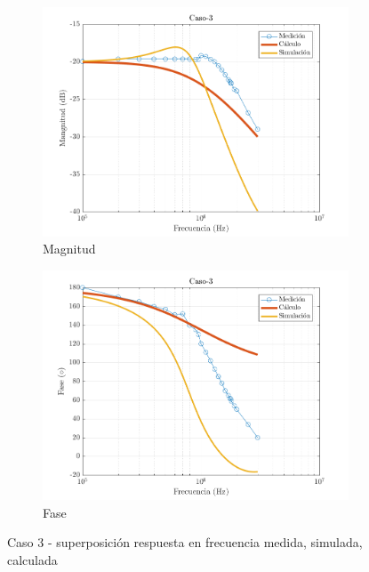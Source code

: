 \documentclass[../../main.tex]{subfiles}
\begin{document}
\begin{figure}[H]
\centering
\begin{subfigure}[http]{0.49\textwidth}
\includegraphics[width=\textwidth]{imagenes/Caso-3_mag_inv.png}
\caption{Magnitud}\label{fig=magInvC3}
\end{subfigure}
\begin{subfigure}[http]{0.49\textwidth}
\includegraphics[width=\textwidth]{imagenes/Caso-3_fase_inv.png}
\caption{Fase} \label{fig=fasInvC3}
\end{subfigure}
\caption{Caso 3 - superposición respuesta en  frecuencia medida, simulada, calculada}
\end{figure}
\end{document}
